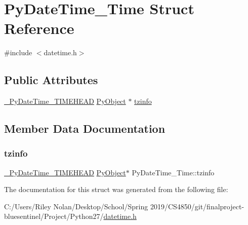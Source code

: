 \hypertarget{struct_py_date_time___time}{}\section{Py\+Date\+Time\+\_\+\+Time Struct Reference}
\label{struct_py_date_time___time}


{\ttfamily \#include $<$datetime.\+h$>$}

\subsection*{Public Attributes}
\begin{DoxyCompactItemize}
\item 
\mbox{\hyperlink{datetime_8h_a50ec910e9774082e73625e3604d71d8c}{\+\_\+\+Py\+Date\+Time\+\_\+\+T\+I\+M\+E\+H\+E\+AD}} \mbox{\hyperlink{_python27_2object_8h_aadc84ac7aed2cfa6f20c25f62bf3dac7}{Py\+Object}} $\ast$ \mbox{\hyperlink{struct_py_date_time___time_ac61bbd01aee42135152e93a5212bb689}{tzinfo}}
\end{DoxyCompactItemize}


\subsection{Member Data Documentation}
\mbox{\label{struct_py_date_time___time_ac61bbd01aee42135152e93a5212bb689}} 
\subsubsection{\texorpdfstring{tzinfo}{tzinfo}}
{\footnotesize\ttfamily \mbox{\hyperlink{datetime_8h_a50ec910e9774082e73625e3604d71d8c}{\+\_\+\+Py\+Date\+Time\+\_\+\+T\+I\+M\+E\+H\+E\+AD}} \mbox{\hyperlink{_python27_2object_8h_aadc84ac7aed2cfa6f20c25f62bf3dac7}{Py\+Object}}$\ast$ Py\+Date\+Time\+\_\+\+Time\+::tzinfo}



The documentation for this struct was generated from the following file\+:\begin{DoxyCompactItemize}
\item 
C\+:/\+Users/\+Riley Nolan/\+Desktop/\+School/\+Spring 2019/\+C\+S4850/git/finalproject-\/bluesentinel/\+Project/\+Python27/\mbox{\hyperlink{datetime_8h}{datetime.\+h}}\end{DoxyCompactItemize}
